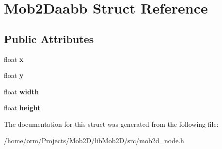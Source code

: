\hypertarget{structMob2Daabb}{
\section{Mob2Daabb Struct Reference}
\label{structMob2Daabb}
}
\subsection*{Public Attributes}
\begin{DoxyCompactItemize}
\item 
\hypertarget{structMob2Daabb_a68dd907778f166f894ac33ce772483e4}{
float {\bfseries x}}
\label{structMob2Daabb_a68dd907778f166f894ac33ce772483e4}

\item 
\hypertarget{structMob2Daabb_a5dcbfa6da38f0f1d12103b3a29a84eac}{
float {\bfseries y}}
\label{structMob2Daabb_a5dcbfa6da38f0f1d12103b3a29a84eac}

\item 
\hypertarget{structMob2Daabb_a3c1a41d25ae9869d013cf1cc6be5c14f}{
float {\bfseries width}}
\label{structMob2Daabb_a3c1a41d25ae9869d013cf1cc6be5c14f}

\item 
\hypertarget{structMob2Daabb_aa77174d5cf8a5e164bbe5634e17129f7}{
float {\bfseries height}}
\label{structMob2Daabb_aa77174d5cf8a5e164bbe5634e17129f7}

\end{DoxyCompactItemize}


The documentation for this struct was generated from the following file:\begin{DoxyCompactItemize}
\item 
/home/orm/Projects/Mob2D/libMob2D/src/mob2d\_\-node.h\end{DoxyCompactItemize}
